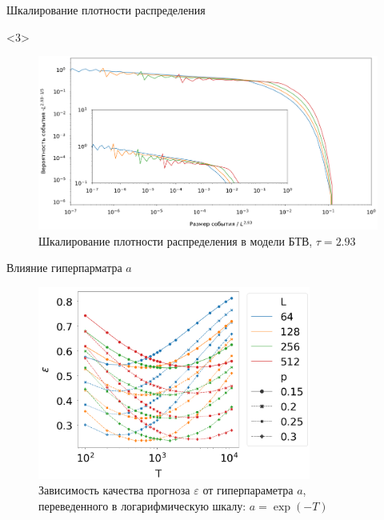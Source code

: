 \documentclass{beamer}
\begin{document}
\begin{frame}{Шкалирование плотности распределения}
		\begin{onlyenv}<3>
			\begin{figure}[h]
				\centering
				\includegraphics[width=\textwidth]{images/btw_distribution_293}
				\caption*{Шкалирование плотности распределения в модели БТВ, $\tau = 2.93$}
			\end{figure}
		\end{onlyenv}
	\end{frame}

	\begin{frame}{Влияние гиперпарматра $a$}
		\begin{figure}[h]
			\centering
			\includegraphics[width=0.8\textwidth]{images/manna_t_267}
			\caption*{Зависимость качества прогноза $\varepsilon$ от гиперпараметра $a$, переведенного в логарифмическую шкалу: $a = \exp(-T)$}
		\end{figure}
	\end{frame}
\end{document}
